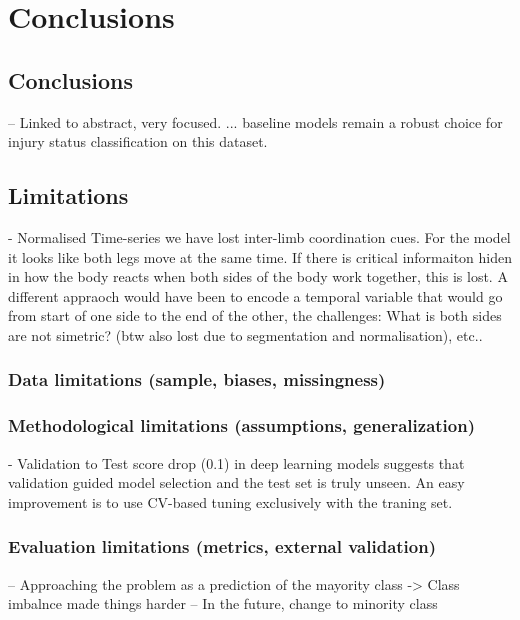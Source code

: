 \chapter{Conclusions}\label{chap:conclusions}

\section{Conclusions}\label{sec:conc-conclusions}
-- Linked to abstract, very focused.
... baseline models remain a robust choice for injury status classification on this dataset.

\section{Limitations}\label{sec:conc-limitations}
- Normalised Time-series we have lost inter-limb coordination cues. For the model it looks like both legs move at the same time. If there is critical informaiton hiden in how the body reacts when both sides of the body work together, this is lost. A different appraoch would have been to encode a temporal variable that would go from start of one side to the end of the other, the challenges: What is both sides are not simetric? (btw also lost due to segmentation and normalisation), etc..

\subsection{Data limitations (sample, biases, missingness)}\label{sec:limitations-data}

\subsection{Methodological limitations (assumptions, generalization)}\label{sec:limitations-methods}
- Validation to Test score drop (0.1) in deep learning models suggests that validation guided model selection and the test set is truly unseen. An easy improvement is to use CV-based tuning exclusively with the traning set.

\subsection{Evaluation limitations (metrics, external validation)}\label{sec:limitations-evaluation}
-- Approaching the problem as a prediction of the mayority class -> Class imbalnce made things harder
    -- In the future, change to minority class

